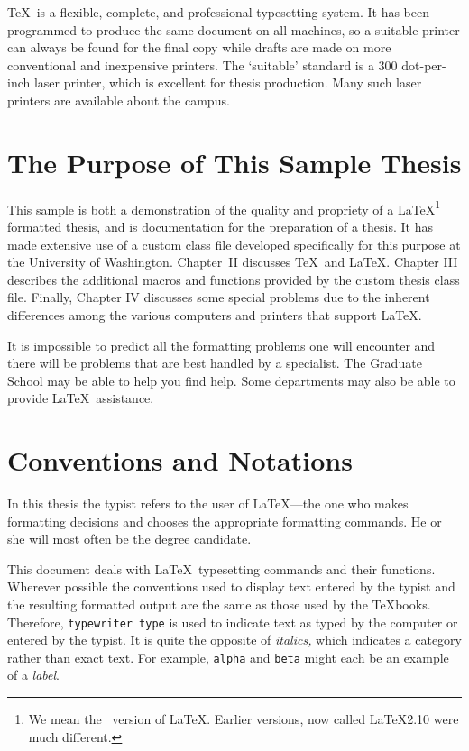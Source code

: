 \documentclass [11pt, twoside] {uwthesis}[2012/06/19]
\begin{document}
 
\TeX\ is a flexible,
complete, and professional typesetting system.
It has been programmed to produce
the same document on all machines, so
a suitable printer can always be found for the final copy
while drafts are made on more conventional and inexpensive printers.
The `suitable' standard is a 300 dot-per-inch laser printer,
which is excellent for thesis production.  Many such laser printers
are available about the campus.
 
\section{The Purpose of This Sample Thesis}
 
This sample is both a demonstration of the quality and
propriety of a \LaTeX\footnote{We mean the \LaTeXe\ version
of \LaTeX.  Earlier versions, now called \LaTeX2.10 were much
different.} formatted thesis, and is 
documentation for the preparation of a thesis.
It has made extensive use of a custom class file
developed specifically for this purpose
at the University of Washington.  Chapter~II discusses
\TeX\ and \LaTeX.
Chapter III describes the additional macros and functions
provided by the custom thesis class file.  Finally, Chapter IV discusses
some special problems due to the inherent differences among the various
computers and printers that support \LaTeX.
 
It is 
impossible to predict all the formatting problems one will encounter
and there will be problems that are best handled
by a specialist.  
The Graduate School may be able to help you find help.
Some departments may also be able to provide \LaTeX\ assistance.
 
 
\section{Conventions and Notations}
 
In this thesis the typist
refers to the user of \LaTeX---the one who
makes formatting decisions and chooses the appropriate
formatting commands.
He or she will most often be the degree candidate.
 
This document deals with \LaTeX\ typesetting commands and their
functions.  Wherever possible the conventions used to display
text entered by the typist and the resulting formatted output
are the same as those used by the \TeX books.
Therefore, {\tt typewriter type} is used to indicate text
as typed by the computer
or entered by the typist.
It is quite the opposite of {\it italics,} which indicates
a category rather than exact text.  For example,
{\tt alpha} and {\tt beta} might each be an example of a {\it label}.
 
\end{document}
